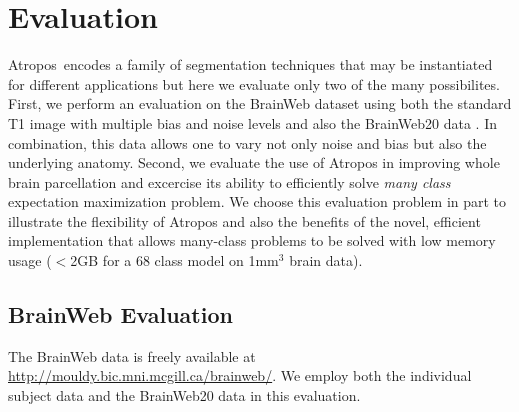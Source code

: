 \documentclass[11pt,english]{article}
\begin{document}
{\section{Evaluation}
Atropos~encodes a family of segmentation techniques that may be
instantiated for different applications but here we evaluate only two
of the many possibilites. First, we perform an evaluation on the
BrainWeb dataset using both the standard T1 image with multiple bias
and noise levels and also the BrainWeb20 data
\citep{Aubert-Broche2006a,Battaglini2008}.  In combination, this data
allows one to vary not only noise and bias but also the underlying
anatomy.  Second, we evaluate the use of Atropos in improving whole
brain parcellation and excercise its ability to efficiently solve {\em
many class} expectation maximization problem.  We choose this
evaluation problem in part to illustrate the flexibility of Atropos
and also the benefits of the novel, efficient implementation that
allows many-class problems to be solved with low memory usage ($<$2GB
for a 68 class model on 1mm$^3$ brain data).


\subsection{BrainWeb Evaluation}
\label{sec:bweb} The BrainWeb data is freely available at
\url{http://mouldy.bic.mni.mcgill.ca/brainweb/}.  We employ both the
individual subject data and the BrainWeb20 data in this evaluation.
}
\end{document}

